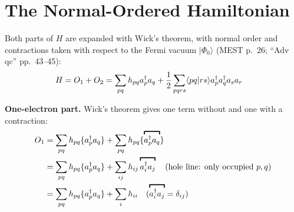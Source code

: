 \section{The Normal-Ordered Hamiltonian}

Both parts of $H$ are expanded with Wick's theorem, with normal order and contractions taken with respect to the Fermi vacuum $|\Phi_0\rangle$ (MEST p.~26; “Adv qc” pp.~43--45):
\begin{align*}
H &= O_1 + O_2 = \sum_{pq} h_{pq} a^{\dagger}_{p} a_{q} + \frac{1}{2} \sum_{pqrs} \langle pq\vert rs\rangle a^{\dagger}_{p} a^{\dagger}_{q} a_{s} a_{r}
\end{align*}

\textbf{One-electron part.} Wick's theorem gives one term without and one with a contraction:
\begin{align*}
O_1 &= \sum_{pq} h_{pq} \no{\cre{p} \ann{q}} + \sum_{pq} h_{pq} \no{\contraction{\cre{p} \ann{q}}} \\
&= \sum_{pq} h_{pq} \no{\cre{p} \ann{q}} + \sum_{ij} h_{ij} \contraction{\cre{i} \ann{j}} \eqnote{hole line: only occupied $p, q$} \\
&= \sum_{pq} h_{pq} \no{\cre{p} \ann{q}} + \sum_{i} h_{ii} \eqnote{$\contraction{\cre{i} \ann{j}} = \delta_{ij}$}
\end{align*}

